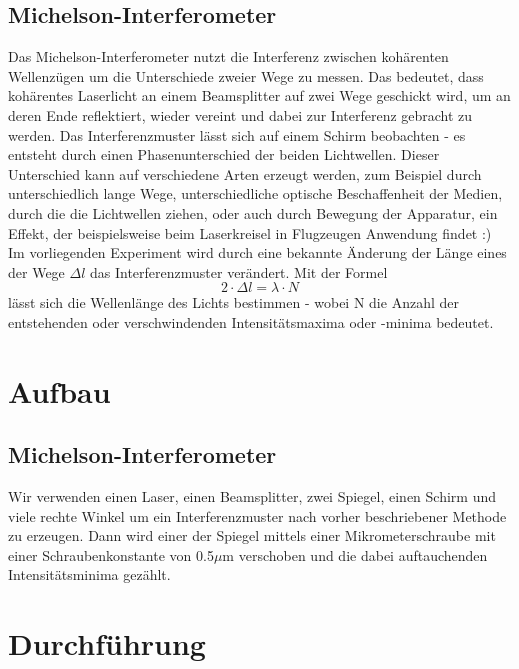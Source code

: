 \documentclass{article}
\begin{document}
\subsection{}

\subsection{Michelson-Interferometer}

Das Michelson-Interferometer nutzt die Interferenz zwischen kohärenten Wellenzügen um die Unterschiede zweier Wege zu messen. Das bedeutet, dass kohärentes Laserlicht an einem Beamsplitter auf zwei Wege geschickt wird, um an deren Ende reflektiert, wieder vereint und dabei zur Interferenz gebracht zu werden. Das Interferenzmuster lässt sich auf einem Schirm beobachten - es entsteht durch einen Phasenunterschied der beiden Lichtwellen. Dieser Unterschied kann auf verschiedene Arten erzeugt werden, zum Beispiel durch unterschiedlich lange Wege, unterschiedliche optische Beschaffenheit der Medien, durch die die Lichtwellen ziehen, oder auch durch Bewegung der Apparatur, ein Effekt, der beispielsweise beim Laserkreisel in Flugzeugen Anwendung findet :)\\
Im vorliegenden Experiment wird durch eine bekannte Änderung der Länge eines der Wege $\Delta l$ das Interferenzmuster verändert. Mit der Formel 
\begin{equation}
\label{equ:Michelson}
2\cdot \Delta l= \lambda \cdot N
\end{equation}
lässt sich die Wellenlänge des Lichts bestimmen - wobei N die Anzahl der entstehenden oder verschwindenden Intensitätsmaxima oder -minima bedeutet. 
\section{Aufbau}
\subsection{Michelson-Interferometer}
Wir verwenden einen Laser, einen Beamsplitter, zwei Spiegel, einen Schirm und viele rechte Winkel um ein Interferenzmuster nach vorher beschriebener Methode zu erzeugen. Dann wird einer der Spiegel mittels einer Mikrometerschraube mit einer Schraubenkonstante von 0.5$\mu$m verschoben und die dabei auftauchenden Intensitätsminima gezählt. 
\section{Durchführung}
\end{document}
